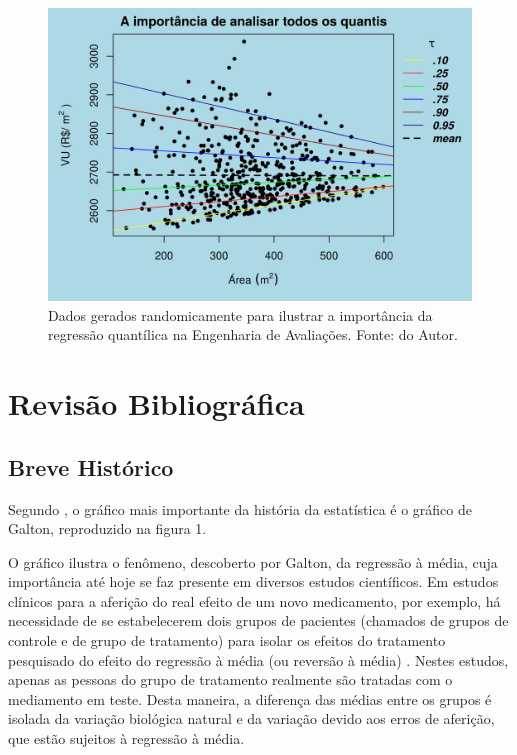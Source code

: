 \documentclass[a4paper, 12pt]{article}
\begin{document}
\begin{figure}[H]

{\centering \includegraphics[width=1\linewidth]{images/urb-1} 

}

\caption{Dados gerados randomicamente para ilustrar a importância da regressão quantílica na Engenharia de Avaliações. Fonte: do Autor.}\label{fig:urb}
\end{figure}

\hypertarget{revisao-bibliografica}{%
\section{Revisão Bibliográfica}\label{revisao-bibliografica}}

\hypertarget{breve-historico}{%
\subsection{Breve Histórico}\label{breve-historico}}

\textcite{stigler1986}

Segundo \textcite[p.~347]{koenker2000}, o gráfico mais importante da
história da estatística é o gráfico de Galton, reproduzido na figura 1.

O gráfico ilustra o fenômeno, descoberto por Galton, da regressão à
média, cuja importância até hoje se faz presente em diversos estudos
científicos. Em estudos clínicos para a aferição do real efeito de um
novo medicamento, por exemplo, há necessidade de se estabelecerem dois
grupos de pacientes (chamados de grupos de controle e de grupo de
tratamento) para isolar os efeitos do tratamento pesquisado do efeito do
regressão à média (ou reversão à média) \autocite[ver][]{james1973}.
Nestes estudos, apenas as pessoas do grupo de tratamento realmente são
tratadas com o mediamento em teste. Desta maneira, a diferença das
médias entre os grupos é isolada da variação biológica natural e da
variação devido aos erros de aferição, que estão sujeitos à regressão à
média.
\end{document}
